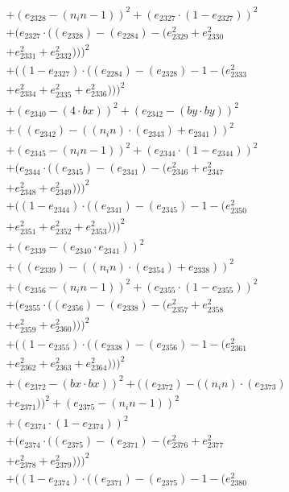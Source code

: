 \documentclass[10pt, a4paper]{article}
\begin{document}
\begin{align*}
& + (e_{2328} - (n_in - 1))^{2} + (e_{2327}  \cdot  (1 - e_{2327}))^{2} \\
& + (e_{2327}  \cdot  ((e_{2328}) - (e_{2284}) - (e_{2329}^{2} + e_{2330}^{2} \\
& + e_{2331}^{2} + e_{2332}^{2})))^{2} \\
& + ((1 - e_{2327})  \cdot  ((e_{2284}) - (e_{2328}) - 1 - (e_{2333}^{2} \\
& + e_{2334}^{2} + e_{2335}^{2} + e_{2336}^{2})))^{2} \\
& + (e_{2340} - (4  \cdot  bx))^{2} + (e_{2342} - (by  \cdot  by))^{2} \\
& + ((e_{2342}) - ((n_in)  \cdot  (e_{2343}) + e_{2341}))^{2} \\
& + (e_{2345} - (n_in - 1))^{2} + (e_{2344}  \cdot  (1 - e_{2344}))^{2} \\
& + (e_{2344}  \cdot  ((e_{2345}) - (e_{2341}) - (e_{2346}^{2} + e_{2347}^{2} \\
& + e_{2348}^{2} + e_{2349}^{2})))^{2} \\
& + ((1 - e_{2344})  \cdot  ((e_{2341}) - (e_{2345}) - 1 - (e_{2350}^{2} \\
& + e_{2351}^{2} + e_{2352}^{2} + e_{2353}^{2})))^{2} \\
& + (e_{2339} - (e_{2340}  \cdot  e_{2341}))^{2} \\
& + ((e_{2339}) - ((n_in)  \cdot  (e_{2354}) + e_{2338}))^{2} \\
& + (e_{2356} - (n_in - 1))^{2} + (e_{2355}  \cdot  (1 - e_{2355}))^{2} \\
& + (e_{2355}  \cdot  ((e_{2356}) - (e_{2338}) - (e_{2357}^{2} + e_{2358}^{2} \\
& + e_{2359}^{2} + e_{2360}^{2})))^{2} \\
& + ((1 - e_{2355})  \cdot  ((e_{2338}) - (e_{2356}) - 1 - (e_{2361}^{2} \\
& + e_{2362}^{2} + e_{2363}^{2} + e_{2364}^{2})))^{2} \\
& + (e_{2372} - (bx  \cdot  bx))^{2} + ((e_{2372}) - ((n_in)  \cdot  (e_{2373}) \\
& + e_{2371}))^{2} + (e_{2375} - (n_in - 1))^{2} \\
& + (e_{2374}  \cdot  (1 - e_{2374}))^{2} \\
& + (e_{2374}  \cdot  ((e_{2375}) - (e_{2371}) - (e_{2376}^{2} + e_{2377}^{2} \\
& + e_{2378}^{2} + e_{2379}^{2})))^{2} \\
& + ((1 - e_{2374})  \cdot  ((e_{2371}) - (e_{2375}) - 1 - (e_{2380}^{2} \\

\end{align*}
\end{document}

